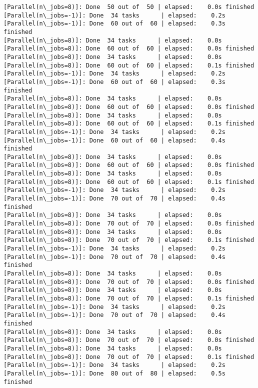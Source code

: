 \documentclass[11pt]{article}
\begin{document}
\begin{Verbatim}[commandchars=\\\{\}]
[Parallel(n\_jobs=8)]: Done  50 out of  50 | elapsed:    0.0s finished
[Parallel(n\_jobs=-1)]: Done  34 tasks      | elapsed:    0.2s
[Parallel(n\_jobs=-1)]: Done  60 out of  60 | elapsed:    0.3s finished
[Parallel(n\_jobs=8)]: Done  34 tasks      | elapsed:    0.0s
[Parallel(n\_jobs=8)]: Done  60 out of  60 | elapsed:    0.0s finished
[Parallel(n\_jobs=8)]: Done  34 tasks      | elapsed:    0.0s
[Parallel(n\_jobs=8)]: Done  60 out of  60 | elapsed:    0.1s finished
[Parallel(n\_jobs=-1)]: Done  34 tasks      | elapsed:    0.2s
[Parallel(n\_jobs=-1)]: Done  60 out of  60 | elapsed:    0.3s finished
[Parallel(n\_jobs=8)]: Done  34 tasks      | elapsed:    0.0s
[Parallel(n\_jobs=8)]: Done  60 out of  60 | elapsed:    0.0s finished
[Parallel(n\_jobs=8)]: Done  34 tasks      | elapsed:    0.0s
[Parallel(n\_jobs=8)]: Done  60 out of  60 | elapsed:    0.1s finished
[Parallel(n\_jobs=-1)]: Done  34 tasks      | elapsed:    0.2s
[Parallel(n\_jobs=-1)]: Done  60 out of  60 | elapsed:    0.4s finished
[Parallel(n\_jobs=8)]: Done  34 tasks      | elapsed:    0.0s
[Parallel(n\_jobs=8)]: Done  60 out of  60 | elapsed:    0.0s finished
[Parallel(n\_jobs=8)]: Done  34 tasks      | elapsed:    0.0s
[Parallel(n\_jobs=8)]: Done  60 out of  60 | elapsed:    0.1s finished
[Parallel(n\_jobs=-1)]: Done  34 tasks      | elapsed:    0.2s
[Parallel(n\_jobs=-1)]: Done  70 out of  70 | elapsed:    0.4s finished
[Parallel(n\_jobs=8)]: Done  34 tasks      | elapsed:    0.0s
[Parallel(n\_jobs=8)]: Done  70 out of  70 | elapsed:    0.0s finished
[Parallel(n\_jobs=8)]: Done  34 tasks      | elapsed:    0.0s
[Parallel(n\_jobs=8)]: Done  70 out of  70 | elapsed:    0.1s finished
[Parallel(n\_jobs=-1)]: Done  34 tasks      | elapsed:    0.2s
[Parallel(n\_jobs=-1)]: Done  70 out of  70 | elapsed:    0.4s finished
[Parallel(n\_jobs=8)]: Done  34 tasks      | elapsed:    0.0s
[Parallel(n\_jobs=8)]: Done  70 out of  70 | elapsed:    0.0s finished
[Parallel(n\_jobs=8)]: Done  34 tasks      | elapsed:    0.0s
[Parallel(n\_jobs=8)]: Done  70 out of  70 | elapsed:    0.1s finished
[Parallel(n\_jobs=-1)]: Done  34 tasks      | elapsed:    0.2s
[Parallel(n\_jobs=-1)]: Done  70 out of  70 | elapsed:    0.4s finished
[Parallel(n\_jobs=8)]: Done  34 tasks      | elapsed:    0.0s
[Parallel(n\_jobs=8)]: Done  70 out of  70 | elapsed:    0.0s finished
[Parallel(n\_jobs=8)]: Done  34 tasks      | elapsed:    0.0s
[Parallel(n\_jobs=8)]: Done  70 out of  70 | elapsed:    0.1s finished
[Parallel(n\_jobs=-1)]: Done  34 tasks      | elapsed:    0.2s
[Parallel(n\_jobs=-1)]: Done  80 out of  80 | elapsed:    0.5s finished

\end{Verbatim}
\end{document}
